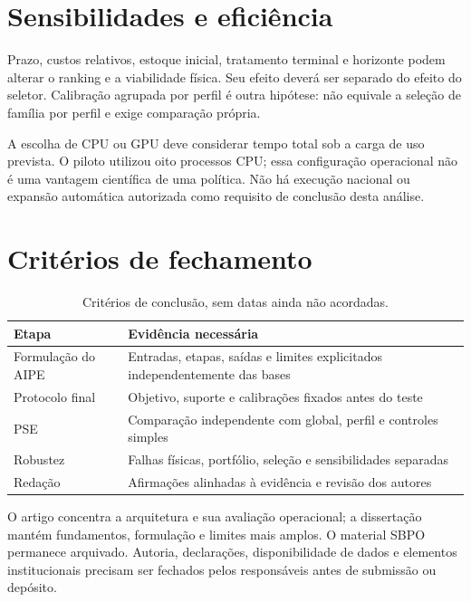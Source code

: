 \section{Sensibilidades e eficiência}
\label{sec:robustez_pooling}
Prazo, custos relativos, estoque inicial, tratamento terminal e horizonte podem alterar o ranking e a viabilidade física. Seu efeito deverá ser separado do efeito do seletor. Calibração agrupada por perfil é outra hipótese: não equivale a seleção de família por perfil e exige comparação própria.

A escolha de CPU ou GPU deve considerar tempo total sob a carga de uso prevista. O piloto utilizou oito processos CPU; essa configuração operacional não é uma vantagem científica de uma política. Não há execução nacional ou expansão automática autorizada como requisito de conclusão desta análise.

\section{Critérios de fechamento}
\begin{table}[htbp]\centering\small
\caption{Critérios de conclusão, sem datas ainda não acordadas.}\label{tab:cronograma}
\begin{tabular}{@{}p{4cm}p{8.8cm}@{}}\toprule
Etapa & Evidência necessária\\\midrule
Formulação do AIPE & Entradas, etapas, saídas e limites explicitados independentemente das bases\\
Protocolo final & Objetivo, suporte e calibrações fixados antes do teste\\
PSE & Comparação independente com global, perfil e controles simples\\
Robustez & Falhas físicas, portfólio, seleção e sensibilidades separadas\\
Redação & Afirmações alinhadas à evidência e revisão dos autores\\\bottomrule
\end{tabular}\end{table}

O artigo concentra a arquitetura e sua avaliação operacional; a dissertação mantém fundamentos, formulação e limites mais amplos. O material SBPO permanece arquivado. Autoria, declarações, disponibilidade de dados e elementos institucionais precisam ser fechados pelos responsáveis antes de submissão ou depósito.

